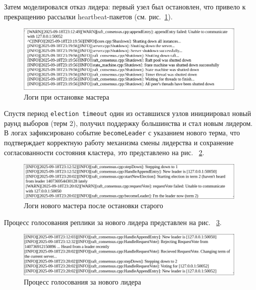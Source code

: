 Затем моделировался отказ лидера: первый узел был остановлен, что привело к
прекращению рассылки heartbeat-пакетов (см. рис.~\ref{fig:leader-shutdown}).

\begin{figure}
  \centering
  \includegraphics[scale=0.4]{inc/master-after-shutdown.png}
  \caption{Логи при остановке мастера}
  \label{fig:leader-shutdown}
\end{figure}

Спустя период \texttt{election timeout} один из оставшихся узлов инициировал
новый раунд выборов (терм 2), получил поддержку большинства и стал новым
лидером. В логах зафиксировано событие \texttt{becomeLeader} с указанием нового
терма, что подтверждает корректную работу механизма смены лидерства и
сохранение согласованности состояния кластера, это представлено на рис.
~\ref{fig:new-master}.

\begin{figure}
  \centering
  \includegraphics[scale=0.4]{inc/replica-master-after-shutdown.png}
  \caption{Логи нового мастера после остановки старого}
  \label{fig:new-master}
\end{figure}

Процесс голосования реплики за нового лидера представлен на рис.
~\ref{fig:replica-after-new-leader}.

\begin{figure}
  \centering
  \includegraphics[scale=0.4]{inc/replica-after-shutdown.png}
  \caption{Процесс голосования за нового лидера}
  \label{fig:replica-after-new-leader}
\end{figure}

